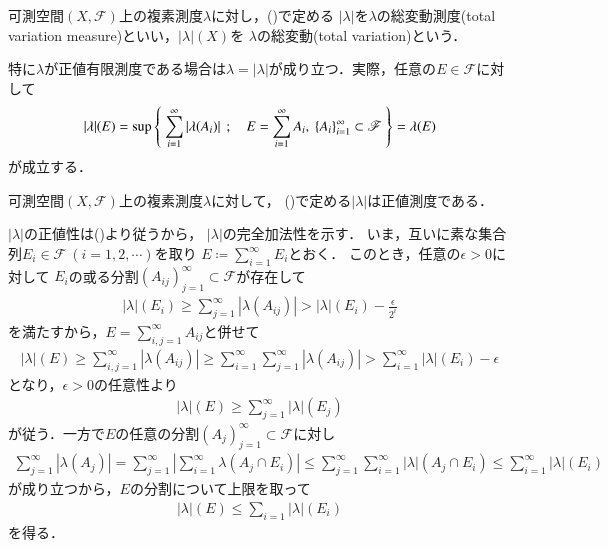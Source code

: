 	\begin{screen}
		\begin{dfn}
			可測空間$(X,\mathscr{F})$上の複素測度$\lambda$に対し，()で定める
			$|\lambda|$を$\lambda$の総変動測度(total variation measure)といい，$|\lambda|(X)$を
			$\lambda$の総変動(total variation)という．
		\end{dfn}
	\end{screen}
	特に$\lambda$が正値有限測度である場合は$\lambda = |\lambda|$が成り立つ．実際，任意の$E \in \mathscr{F}$に対して
	\begin{align}
		|\lambda|(E) = \operatorname*{sup}_{} \left\{\ \sum_{i=1}^{\infty} |\lambda(A_i)|\ \, ; \quad E = \sum_{i=1}^\infty A_i,\ \{A_i\}_{i=1}^\infty \subset \mathscr{F}\ \right\}
		= \lambda(E)
	\end{align}
	が成立する．

	\begin{screen}
		\begin{thm}
			可測空間$(X,\mathscr{F})$上の複素測度$\lambda$に対して，
			()で定める$|\lambda|$は正値測度である．
			\label{thm:total_variation_measure}
		\end{thm}
	\end{screen}
	
	\begin{prf}
		$|\lambda|$の正値性は()より従うから，
		$|\lambda|$の完全加法性を示す．
		いま，互いに素な集合列$E_i \in \mathscr{F}\ (i=1,2,\cdots)$を取り
		$E \coloneqq \sum_{i=1}^{\infty} E_i$とおく．
		このとき，任意の$\epsilon > 0$に対して
		$E_i$の或る分割$(A_{ij})_{j=1}^{\infty} \subset \mathscr{F}$が存在して
		\begin{align}
			|\lambda|(E_i) \geq \sum_{j=1}^{\infty} |\lambda(A_{ij})| 
			> |\lambda|(E_i) - \frac{\epsilon}{2^i}
		\end{align}
		を満たすから，$E = \sum_{i,j=1}^{\infty} A_{ij}$と併せて
		\begin{align}
			|\lambda|(E) \geq \sum_{i,j=1}^{\infty} |\lambda(A_{ij})| \geq \sum_{i=1}^{\infty}\sum_{j=1}^{\infty} |\lambda(A_{ij})| > \sum_{i=1}^{\infty} |\lambda|(E_i) - \epsilon
		\end{align}
		となり，$\epsilon > 0$の任意性より
		\begin{align}
			|\lambda|(E) \geq \sum_{j=1}^{\infty} |\lambda|(E_j)
		\end{align}
		が従う．一方で$E$の任意の分割$(A_j)_{j=1}^{\infty} \subset \mathscr{F}$に対し
		\begin{align}
			\sum_{j=1}^{\infty} |\lambda(A_j)| 
			= \sum_{j=1}^{\infty} \left| \sum_{i=1}^{\infty} \lambda(A_j \cap E_i) \right|
			\leq \sum_{j=1}^{\infty} \sum_{i=1}^{\infty} |\lambda|(A_j \cap E_i)
			\leq \sum_{i=1}^{\infty} |\lambda|(E_i)
		\end{align}
		が成り立つから，$E$の分割について上限を取って
		\begin{align}
			|\lambda|(E) \leq \sum_{i=1} |\lambda|(E_i)
		\end{align}
		を得る．
		\QED
	\end{prf}
	
